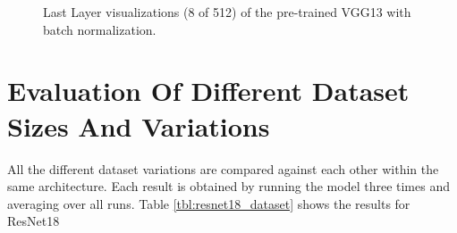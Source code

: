 \begin{figure}[H]
\centering
\caption{Last Layer visualizations (8 of 512) of the pre-trained VGG13 with batch normalization.}
\label{fig:asbestos_gradcam}
\end{figure}

\section{Evaluation Of Different Dataset Sizes And Variations}

All the different dataset variations are compared against each other within the same architecture. Each result is obtained by running the model three times and averaging over all runs. Table \ref{tbl:resnet18_dataset} shows the results for ResNet18

